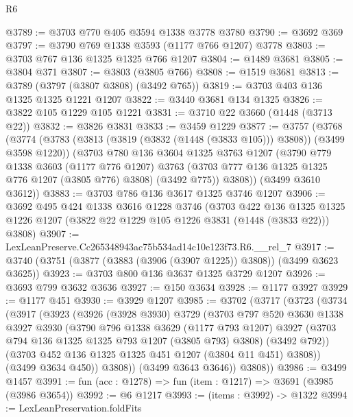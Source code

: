 \begin{lexlean}{R6}
\begin{coremodule}
@3789 := @3703 @770 @405 @3594 @1338 @3778 @3780
@3790 := @3692 @369
@3797 := @3790 @769 @1338 @3593 (@1177 @766 @1207) @3778
@3803 := @3703 @767 @136 @1325 @1325 @766 @1207
@3804 := @1489 @3681
@3805 := @3804 @371
@3807 := @3803 (@3805 @766)
@3808 := @1519 @3681
@3813 := @3789 (@3797 (@3807 @3808) (@3492 @765))
@3819 := @3703 @403 @136 @1325 @1325 @1221 @1207
@3822 := @3440 @3681 @134 @1325
@3826 := @3822 @105 @1229 @105 @1221
@3831 := @3710 @22 @3660 (@1448 (@3713 @22))
@3832 := @3826 @3831
@3833 := @3459 @1229
@3877 := @3757
    (@3768
      (@3774
        (@3783 (@3813 (@3819 (@3832 (@1448 (@3833 @105))) @3808)) (@3499 @3598 @1220))
        (@3703
          @780
          @136
          @3604
          @1325
          @3763
          @1207
          (@3790
            @779
            @1338
            @3603
            (@1177 @776 @1207)
            @3763
            (@3703 @777 @136 @1325 @1325 @776 @1207 (@3805 @776) @3808)
            (@3492 @775))
          @3808))
      (@3499 @3610 @3612))
@3883 := @3703 @786 @136 @3617 @1325 @3746 @1207
@3906 := @3692
    @495
    @424
    @1338
    @3616
    @1228
    @3746
    (@3703
      @422
      @136
      @1325
      @1325
      @1226
      @1207
      (@3822 @22 @1229 @105 @1226 @3831 (@1448 (@3833 @22)))
      @3808)
@3907 := LexLeanPreserve.Cc265348943ac75b534ad14c10e123f73.R6.__rel_7
@3917 := @3740 (@3751 (@3877 (@3883 (@3906 (@3907 @1225)) @3808)) (@3499 @3623 @3625))
@3923 := @3703 @800 @136 @3637 @1325 @3729 @1207
@3926 := @3693 @799 @3632 @3636
@3927 := @150 @3634
@3928 := @1177 @3927
@3929 := @1177 @451
@3930 := @3929 @1207
@3985 := @3702
    (@3717
      (@3723
        (@3734
          (@3917
            (@3923
              (@3926
                (@3928 @3930)
                @3729
                (@3703
                  @797
                  @520
                  @3630
                  @1338
                  @3927
                  @3930
                  (@3790
                    @796
                    @1338
                    @3629
                    (@1177 @793 @1207)
                    @3927
                    (@3703 @794 @136 @1325 @1325 @793 @1207 (@3805 @793) @3808)
                    (@3492 @792))
                  (@3703 @452 @136 @1325 @1325 @451 @1207 (@3804 @11 @451) @3808))
                (@3499 @3634 @450))
              @3808))
          (@3499 @3643 @3646))
        @3808))
@3986 := @3499 @1457
@3991 := fun (acc : @1278) => fun (item : @1217) => @3691 (@3985 (@3986 @3654))
@3992 := @6 @1217
@3993 := (items : @3992) -> @1322
@3994 := LexLeanPreservation.foldFits

\end{coremodule}
\end{lexlean}

